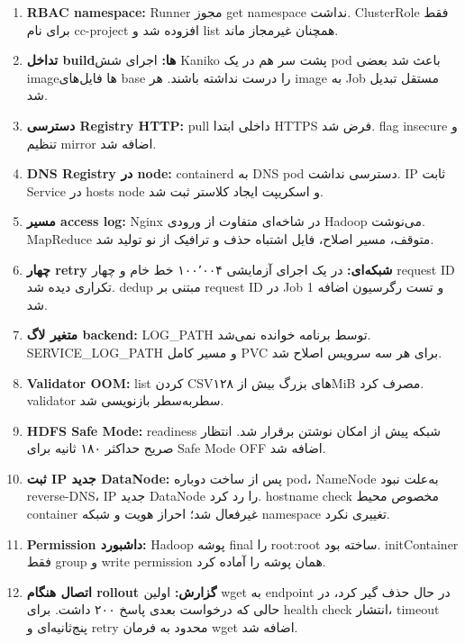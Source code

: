 \documentclass[12pt,a4paper]{article}
\begin{document}
\begin{enumerate}
  \item \textbf{RBAC namespace:} Runner مجوز get namespace نداشت. ClusterRole
  فقط برای نام cc-project افزوده شد و list همچنان غیرمجاز ماند.

  \item \textbf{تداخل buildها:} اجرای شش Kaniko پشت سر هم در یک pod باعث شد
  بعضی imageها فایل‌های base را درست نداشته باشند. هر image به Job مستقل تبدیل
  شد.

  \item \textbf{دسترسی Registry HTTP:} pull داخلی ابتدا HTTPS فرض شد.
  flag insecure و تنظیم mirror اضافه شد.

  \item \textbf{DNS Registry در node:} containerd به DNS pod دسترسی نداشت.
  IP ثابت Service در hosts node و اسکریپت ایجاد کلاستر ثبت شد.

  \item \textbf{مسیر access log:} Nginx در شاخه‌ای متفاوت از ورودی Hadoop
  می‌نوشت. MapReduce متوقف، مسیر اصلاح، فایل اشتباه حذف و ترافیک از نو تولید شد.

  \item \textbf{چهار retry شبکه‌ای:} در یک اجرای آزمایشی ۱۰۰٬۰۰۴ خط خام و
  چهار request ID تکراری دیده شد. dedup مبتنی بر request ID در Job 1 و تست
  رگرسیون اضافه شد.

  \item \textbf{متغیر لاگ backend:} LOG\_PATH توسط برنامه خوانده نمی‌شد.
  SERVICE\_LOG\_PATH و مسیر کامل PVC برای هر سه سرویس اصلاح شد.

  \item \textbf{Validator OOM:} list کردن CSVهای بزرگ بیش از ۱۲۸MiB مصرف کرد.
  validator سطر‌به‌سطر بازنویسی شد.

  \item \textbf{HDFS Safe Mode:} readiness شبکه پیش از امکان نوشتن برقرار شد.
  انتظار صریح حداکثر ۱۸۰ ثانیه برای Safe Mode OFF اضافه شد.

  \item \textbf{ثبت IP جدید DataNode:} پس از ساخت دوباره pod، NameNode به‌علت
  نبود reverse-DNS، IP جدید DataNode را رد کرد. hostname check مخصوص محیط
  container غیرفعال شد؛ احراز هویت و شبکه namespace تغییری نکرد.

  \item \textbf{Permission داشبورد:} Hadoop پوشه final را root:root ساخته بود.
  initContainer فقط group و write permission همان پوشه را آماده کرد.

  \item \textbf{اتصال هنگام rollout گزارش:} اولین wget به endpoint در حال حذف
  گیر کرد، در حالی که درخواست بعدی پاسخ ۲۰۰ داشت. برای health check انتشار،
  timeout پنج‌ثانیه‌ای و retry محدود به فرمان wget اضافه شد.


\end{enumerate}
\end{document}
